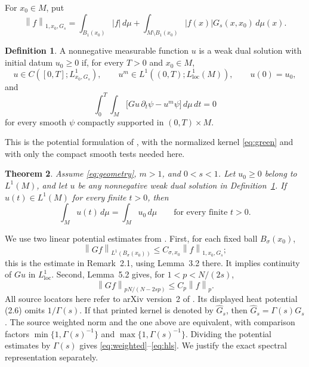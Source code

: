 \documentclass[11pt]{article}
\newtheorem{theorem}{Theorem}[section]
\theoremstyle{definition}
\newtheorem{definition}[theorem]{Definition}
\theoremstyle{remark}
\newcommand{\dd}{\,d\mu}
\newcommand{\norm}[1]{\left\|#1\right\|}
\newcommand{\intM}{\int_M}
\begin{document}
For \(x_0\in M\), put
\[
 \norm{f}_{1,x_0,G_s}
 =\int_{B_1(x_0)}|f|\dd+
 \int_{M\setminus B_1(x_0)}|f(x)|G_s(x,x_0)\dd(x).
\]
\begin{definition}\label{def:wds}
A nonnegative measurable function \(u\) is a weak dual solution
with initial datum \(u_0\ge0\) if, for every \(T>0\) and \(x_0\in M\),
\[
 u\in C([0,T];L^1_{x_0,G_s}),\qquad
 u^m\in L^1((0,T);L^1_{\mathrm{loc}}(M)),\qquad u(0)=u_0,
\]
and
\begin{equation}\label{eq:wds}
 \int_0^T\!\intM
 \bigl[Gu\,\partial_t\psi-u^m\psi\bigr]\dd\,dt=0
\end{equation}
for every smooth \(\psi\) compactly supported in \((0,T)\times M\).
\end{definition}
This is the potential formulation of \cite[Definition~2.1]{BBGM},
with the normalized kernel \eqref{eq:green} and with only the compact
smooth tests needed here.

\begin{theorem}\label{thm:main}
Assume \eqref{eq:geometry}, \(m>1\), and \(0<s<1\).
Let \(u_0\ge0\) belong to \(L^1(M)\), and let \(u\) be any
nonnegative weak dual solution in Definition~\ref{def:wds}.
If \(u(t)\in L^1(M)\) for every finite \(t>0\), then
\[
 \intM u(t)\dd=\intM u_0\dd
 \qquad\text{for every finite }t>0 .
\]
\end{theorem}

We use two linear potential estimates from \cite{BBGM}. First, for
each fixed ball \(B_\sigma(x_0)\),
\begin{equation}\label{eq:weighted}
 \norm{Gf}_{L^1(B_\sigma(x_0))}
 \le C_{\sigma,x_0}\norm{f}_{1,x_0,G_s};
\end{equation}
this is the estimate in Remark~2.1, using Lemma~3.2 there.
It implies continuity of \(Gu\) in \(L^1_{\mathrm{loc}}\).
Second, Lemma~5.2 gives, for \(1<p<N/(2s)\),
\begin{equation}\label{eq:hls}
 \norm{Gf}_{pN/(N-2sp)}\le C_p\norm{f}_p .
\end{equation}
All source locators here refer to arXiv version~2 of \cite{BBGM}.
Its displayed heat potential (2.6) omits \(1/\Gamma(s)\).
If that printed kernel is denoted by \(\widehat G_s\), then
\(\widehat G_s=\Gamma(s)G_s\). The source weighted norm and the
one above are equivalent, with comparison factors
\(\min\{1,\Gamma(s)^{-1}\}\) and
\(\max\{1,\Gamma(s)^{-1}\}\). Dividing the potential estimates
by \(\Gamma(s)\) gives \eqref{eq:weighted}--\eqref{eq:hls}.
We justify the exact spectral representation separately.
\end{document}
